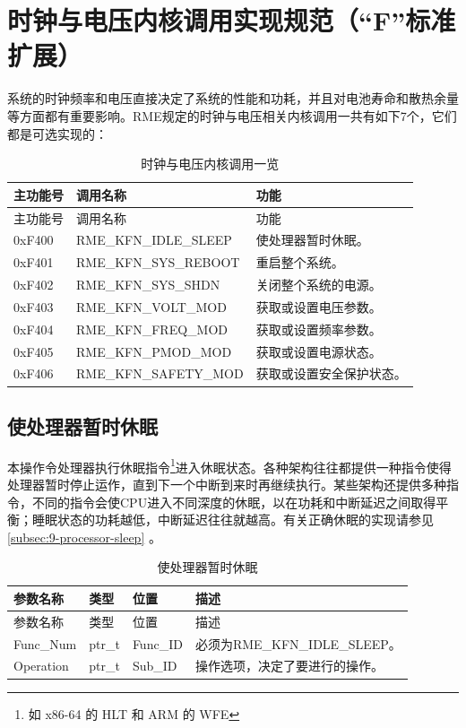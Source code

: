 \section{时钟与电压内核调用实现规范（``F''标准扩展）}\label{sec:8-clock-and-voltage-kernel-calls}
\nopagebreak[4]

系统的时钟频率和电压直接决定了系统的性能和功耗，并且对电池寿命和散热余量等方面都有重要影响。RME规定的时钟与电压相关内核调用一共有如下7个，它们都是可选实现的：

\begin{xltabular}{\textwidth}{@{}>{\hsize\raggedright\arraybackslash}X>{\hsize\raggedright\arraybackslash}X>{\hsize\raggedright\arraybackslash}X@{}}
\caption{时钟与电压内核调用一览}\label{tab:8-42-clock-and-voltage-kernel-calls}\\
\toprule
主功能号 & 调用名称 & 功能\tabularnewline
\endfirsthead
\toprule
主功能号 & 调用名称 & 功能\tabularnewline
\midrule
\endhead
\bottomrule
\endlastfoot
0xF400 & RME\_KFN\_IDLE\_SLEEP & 使处理器暂时休眠。\tabularnewline
0xF401 & RME\_KFN\_SYS\_REBOOT & 重启整个系统。\tabularnewline
0xF402 & RME\_KFN\_SYS\_SHDN & 关闭整个系统的电源。\tabularnewline
0xF403 & RME\_KFN\_VOLT\_MOD & 获取或设置电压参数。\tabularnewline
0xF404 & RME\_KFN\_FREQ\_MOD & 获取或设置频率参数。\tabularnewline
0xF405 & RME\_KFN\_PMOD\_MOD & 获取或设置电源状态。\tabularnewline
0xF406 & RME\_KFN\_SAFETY\_MOD & 获取或设置安全保护状态。\tabularnewline
\end{xltabular}

\subsection{使处理器暂时休眠}\label{subsec:8-put-processor-to-sleep}

本操作令处理器执行休眠指令\footnote{如 x86-64 的 HLT 和 ARM 的 WFE}进入休眠状态。各种架构往往都提供一种指令使得处理器暂时停止运作，直到下一个中断到来时再继续执行。某些架构还提供多种指令，不同的指令会使CPU进入不同深度的休眠，以在功耗和中断延迟之间取得平衡；睡眠状态的功耗越低，中断延迟往往就越高。有关正确休眠的实现请参见\ref{subsec:9-processor-sleep}
。

\begin{xltabular}{\textwidth}{@{}>{\hsize\raggedright\arraybackslash}X>{\hsize\raggedright\arraybackslash}X>{\hsize\raggedright\arraybackslash}X>{\hsize\raggedright\arraybackslash}X@{}}
\caption{使处理器暂时休眠}\label{tab:8-43-put-processor-to-sleep}\\
\toprule
参数名称 & 类型 & 位置 & 描述\tabularnewline
\endfirsthead
\toprule
参数名称 & 类型 & 位置 & 描述\tabularnewline
\midrule
\endhead
\bottomrule
\endlastfoot
Func\_Num & ptr\_t & Func\_ID &
必须为RME\_KFN\_IDLE\_SLEEP。\tabularnewline
Operation & ptr\_t & Sub\_ID &
操作选项，决定了要进行的操作。\tabularnewline
\end{xltabular}

